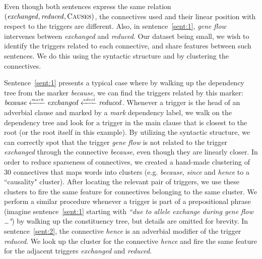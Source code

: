 Even though both sentences express the same relation $(\mbox{\emph{exchanged}},\mbox{\emph{reduced}},\mbox{\textsc{Causes}})$, the connectives used and their linear position with respect to the triggers are different. Also, in sentence~\ref{sent:1}, \emph{gene flow} intervenes between \emph{exchanged} and \emph{reduced}. Our dataset being small, we wish to identify the triggers related to each connective, and share features between such sentences. We do this using the syntactic structure and by clustering the connectives.

Sentence~\ref{sent:1} presents a typical case where by walking up the dependency tree from the marker \emph{because}, we can find the triggers related by this marker: $\mbox{\emph{because}}\xleftarrow{\scriptscriptstyle mark}\mbox{\emph{exchanged}}\xleftarrow{\scriptscriptstyle advcl}\mbox{\emph{reduced}}$. Whenever a trigger is the head of an adverbial clause and marked by a \emph{mark} dependency label, we walk on the dependency tree and look for a trigger in the main clause that is closest to the root (or the root itself in this example). 
By utilizing the syntactic structure, we can correctly spot that the trigger \emph{gene flow} is not related to the trigger \emph{exchanged} through the connective \emph{because}, even though they are linearly closer. In order to reduce sparseness of connectives, we created a hand-made clustering of 30 connectives that maps words into clusters (e.g. \emph{because}, \emph{since} and \emph{hence} to a ``causality" cluster). After locating the relevant pair of triggers, we use these clusters to fire the same feature for connectives belonging to the same cluster. We perform a similar procedure whenever a trigger is part of a prepositional phrase (imagine sentence~\ref{sent:1} starting with \emph{``due to allele exchange during gene flow \ldots"}) by walking up the constituency tree, but details are omitted for brevity. In sentence~\ref{sent:2}, the connective \emph{hence} is an adverbial modifier of the trigger \emph{reduced}. We look up the cluster for the connective \emph{hence} and fire the same feature for the adjacent triggers \emph{exchanged} and \emph{reduced}.

